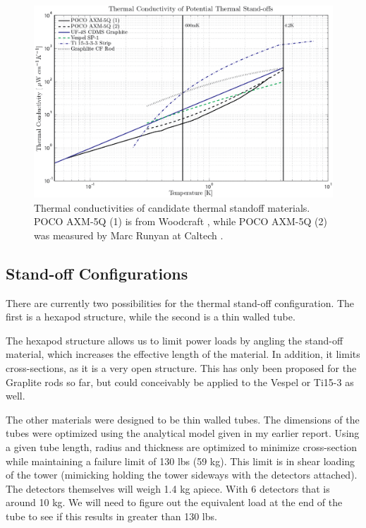 \documentclass{report}
\begin{document}
\begin{figure}
\includegraphics[width = \textwidth]{Stand_off_graph.png}
\caption{Thermal conductivities of candidate thermal standoff materials. POCO AXM-5Q (1) is from Woodcraft \cite{woo:gr} , while POCO AXM-5Q (2) was measured by Marc Runyan at Caltech \cite{run}.}
\end{figure}

\subsection{Stand-off Configurations}
There are currently two possibilities for the thermal stand-off configuration. The first is a hexapod structure, while the second is a thin walled tube.

The hexapod structure allows us to limit power loads by angling the stand-off material, which increases the effective length of the material. In addition, it limits cross-sections, as it is a very open structure. This has only been proposed for the Graplite rods so far, but could conceivably be applied to the Vespel or Ti15-3 as well.

The other materials were designed to be thin walled tubes. The dimensions of the tubes were optimized using the analytical model given in my earlier report. Using a given tube length, radius and thickness are optimized to minimize cross-section while maintaining a failure limit of 130 lbs (59 kg). This limit is in shear loading of the tower (mimicking holding the tower sideways with the detectors attached). The detectors themselves will weigh 1.4 kg apiece. With 6 detectors that is around 10 kg. We will need to figure out the equivalent load at the end of the tube to see if this results in greater than 130 lbs.
\end{document}
